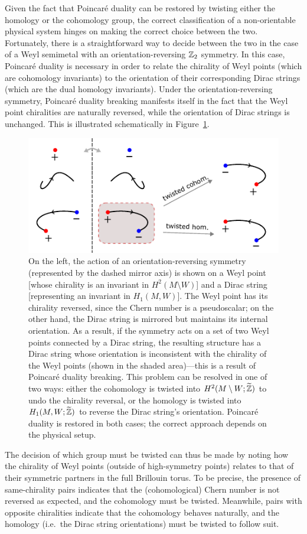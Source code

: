 Given the fact that Poincaré duality can be restored by twisting either the homology or the cohomology group, the correct classification of a non-orientable physical system hinges on making the correct choice between the two. Fortunately, there is a straightforward way to decide between the two in the case of a Weyl semimetal with an orientation-reversing $\mathbb{Z}_2$ symmetry. In this case, Poincaré duality is necessary in order to relate the chirality of Weyl points (which are cohomology invariants) to the orientation of their corresponding Dirac strings (which are the dual homology invariants). Under the orientation-reversing symmetry, Poincaré duality breaking manifests itself in the fact that the Weyl point chiralities are naturally reversed, while the orientation of Dirac strings is unchanged. This is illustrated schematically in Figure~\ref{fig:local_coefficients}.
\begin{figure}[htb!]
	\centering
	\includegraphics[width=.9\linewidth]{Images/local_coefficients}
	\caption{On the left, the action of an orientation-reversing symmetry (represented by the dashed mirror axis) is shown on a Weyl point [whose chirality is an invariant in $H^2(M\setminus W)$] and a Dirac string  [representing an invariant in $H_1(M,W)$]. The Weyl point has its chirality reversed, since the Chern number is a pseudoscalar; on the other hand, the Dirac string is mirrored but maintains its internal orientation. As a result, if the symmetry acts on a set of two Weyl points connected by a Dirac string, the resulting structure has a Dirac string whose orientation is inconsistent with the chirality of the Weyl points (shown in the shaded area)---this is a result of Poincaré duality breaking. This problem can be resolved in one of two ways: either the cohomology is twisted into $H^2(M\setminus W;\widetilde{\mathbb{Z}})$ to undo the chirality reversal, or the homology is twisted into $H_1(M,W;\widetilde{\mathbb{Z}})$ to reverse the Dirac string's orientation. Poincaré duality is restored in both cases; the correct approach depends on the physical setup.}
	\label{fig:local_coefficients}
\end{figure}
The decision of which group must be twisted can thus be made by noting how the chirality of Weyl points (outside of high-symmetry points) relates to that of their symmetric partners in the full Brillouin torus. To be precise, the presence of same-chirality pairs indicates that the (cohomological) Chern number is not reversed as expected, and the cohomology must be twisted. Meanwhile, pairs with opposite chiralities indicate that the cohomology behaves naturally, and the homology (i.e.\ the Dirac string orientations) must be twisted to follow suit.

